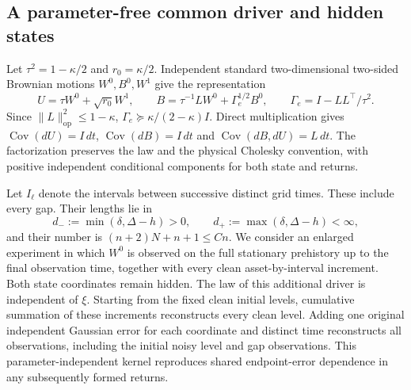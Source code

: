 \documentclass[11pt,a4paper]{amsart}
\theoremstyle{plain}
\theoremstyle{definition}
\theoremstyle{remark}
\DeclareMathOperator{\Cov}{Cov}
\begin{document}
\subsection{A parameter-free common driver and hidden states}

Let $\tau^2=1-\kappa/2$ and $r_0=\kappa/2$. Independent standard
two-dimensional two-sided Brownian motions $W^0,B^0,W^1$ give the representation
\begin{equation}\label{eq:common-factor}
 U=\tau W^0+\sqrt{r_0}W^1,\qquad
 B=\tau^{-1}LW^0+\Gamma_e^{1/2}B^0,\qquad
 \Gamma_e=I-LL^\top/\tau^2.
\end{equation}
Since $\|L\|_{\mathrm{op}}^2\le1-\kappa$,
$\Gamma_e\succeq\kappa/(2-\kappa)I$.
Direct multiplication gives
$\Cov(dU)=I\,dt$, $\Cov(dB)=I\,dt$ and
$\Cov(dB,dU)=L\,dt$. The factorization preserves the law and the
physical Cholesky convention, with positive independent conditional
components for both state and returns.

Let $I_\ell$ denote the intervals between successive distinct grid times.
These include every gap. Their lengths lie in
\begin{equation}\label{eq:interval-bounds}
 d_-:=\min(\delta,\Delta-h)>0,\qquad
 d_+:=\max(\delta,\Delta-h)<\infty,
\end{equation}
and their number is $(n+2)N+n+1\le Cn$. We consider an enlarged experiment
in which $W^0$ is observed on the full stationary prehistory up to the final
observation time, together with every clean asset-by-interval increment.
Both state coordinates remain hidden. The law of this additional driver
is independent of $\xi$.
Starting from the fixed clean initial levels, cumulative summation of
these increments reconstructs every clean level. Adding one original
independent Gaussian error for each coordinate and distinct time
reconstructs all observations, including the initial noisy level and gap
observations. This parameter-independent kernel reproduces shared
endpoint-error dependence in any subsequently formed returns.
\end{document}
